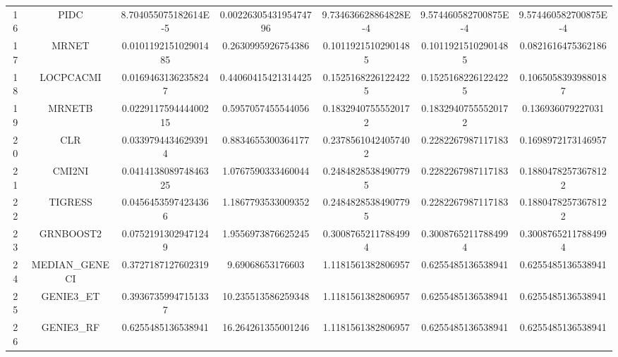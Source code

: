 \documentclass[a4paper,10pt]{article}
\begin{document}
\begin{landscape}
\begin{table}[!htp]
\begin{tabular}{ccccccc}
16&PIDC&8.704055075182614E-5&0.0022630543195474796&9.734636628864828E-4&9.574460582700875E-4&9.574460582700875E-4\\
17&MRNET&0.010119215102901485&0.2630995926754386&0.10119215102901485&0.10119215102901485&0.0821616475362186\\
18&LOCPCACMI&0.01694631362358247&0.44060415421314425&0.15251682261224225&0.15251682261224225&0.10650583939880187\\
19&MRNETB&0.022911759444400215&0.5957057455544056&0.18329407555520172&0.18329407555520172&0.136936079227031\\
20&CLR&0.03397944346293914&0.8834655300364177&0.23785610424057402&0.2282267987117183&0.1698972173146957\\
21&CMI2NI&0.041413808974846325&1.0767590333460044&0.24848285384907795&0.2282267987117183&0.18804782573678122\\
22&TIGRESS&0.04564535974234366&1.1867793533009352&0.24848285384907795&0.2282267987117183&0.18804782573678122\\
23&GRNBOOST2&0.07521913029471249&1.9556973876625245&0.30087652117884994&0.30087652117884994&0.30087652117884994\\
24&MEDIAN_GENECI&0.3727187127602319&9.69068653176603&1.1181561382806957&0.6255485136538941&0.6255485136538941\\
25&GENIE3_ET&0.39367359947151337&10.235513586259348&1.1181561382806957&0.6255485136538941&0.6255485136538941\\
26&GENIE3_RF&0.6255485136538941&16.264261355001246&1.1181561382806957&0.6255485136538941&0.6255485136538941\\
\hline
\end{tabular}
\end{table}


\end{landscape}
\end{document}
